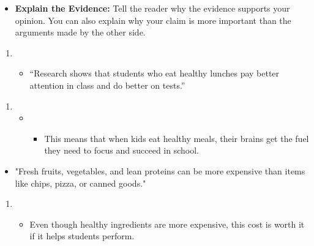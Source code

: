 \documentclass[12pt]{article}
\begin{document}
\begin{tcolorbox}[colframe=black!60, colback=white, 
coltitle=black, colbacktitle=black!15, fonttitle=\bfseries\Large, 
title=Examples, halign title=center, left=10pt, right=10pt, top=10pt, bottom=15pt]
\begin{itemize}
            \item \textbf{Explain the Evidence:} Tell the reader why the evidence supports your opinion. You can also explain why your claim is more important than the arguments made by the other side.
              \end{itemize}   
            \begin{enumerate}
            \item
                \begin{itemize}
                    \item      “Research shows that students who eat healthy lunches pay better attention in class and do better on tests.”
                \end{itemize}
                    \end{enumerate}
                \begin{enumerate}
                \item
                    \begin{itemize}
                    \item
                        \begin{itemize}
                            \item This means that when kids eat healthy meals, their brains get the fuel they need to focus and succeed in school.
                        \end{itemize}
                    \end{itemize}
                \end{enumerate}
  \begin{itemize}
    \item "Fresh fruits, vegetables, and lean proteins can be more expensive than items like chips, pizza, or canned goods."
     \end{itemize}
    \begin{enumerate}
    \item
        \begin{itemize}
            \item Even though healthy ingredients are more expensive, this cost is worth it if it helps students perform.
        \end{itemize}
    \end{enumerate}
                      

     






 


     \end{tcolorbox}
\vspace{1em}
\end{document}
